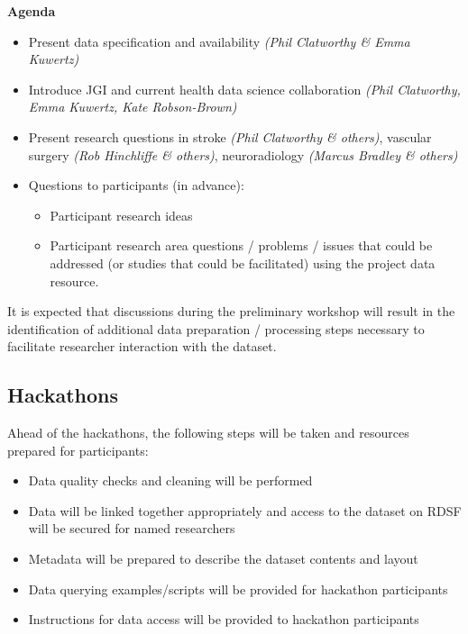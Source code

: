 \documentclass{article}
\begin{document}
\textbf{Agenda}
\begin{itemize}
\item    Present data specification and availability \textit{(Phil
    Clatworthy \& Emma Kuwertz)}
\item    Introduce JGI and current health data science collaboration \textit{(Phil
    Clatworthy, Emma Kuwertz, Kate Robson-Brown)}
\item    Present research questions in stroke \textit{(Phil
    Clatworthy \& others)}, vascular surgery \textit{(Rob Hinchliffe
    \& others)},
  neuroradiology \textit{(Marcus Bradley \& others)}
\item Questions to participants (in advance):
  \begin{itemize}
  \item Participant research ideas
  \item Participant research area questions / problems / issues that
    could be addressed (or studies that could be facilitated) using
    the project data resource.
  \end{itemize}
\end{itemize}

It is expected that discussions during the preliminary workshop will
result in the identification of additional data preparation /
processing steps necessary to facilitate researcher interaction with
the dataset.\\

\subsection{Hackathons}

Ahead of the hackathons, the following steps will be
taken and resources
prepared for participants:

\begin{itemize}
\item Data quality checks and cleaning will be performed
\item Data will be linked together appropriately and access to the
  dataset on RDSF will be secured for named researchers
\item Metadata will be prepared to describe the dataset contents and layout
\item Data querying examples/scripts will be provided for hackathon participants
\item Instructions for data access will be provided to hackathon participants
\end{itemize}
\end{document}
